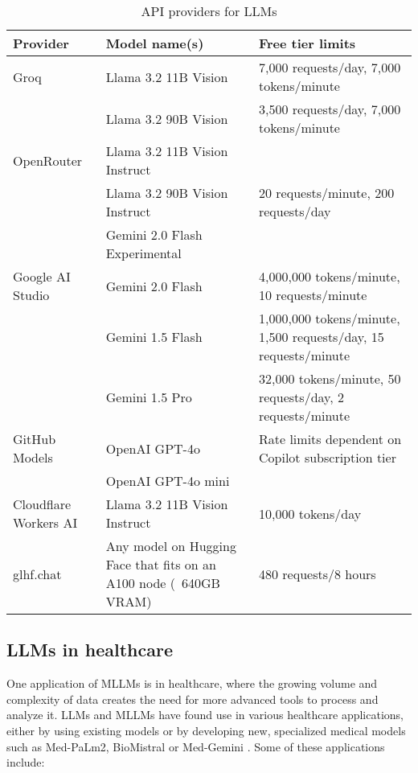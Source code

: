 \begin{table}[h!]
    \centering
    \begin{tabular}{p{2cm} p{5cm} p{6cm}}
        \toprule
        \textbf{Provider} & \textbf{Model name(s)} & \textbf{Free tier limits} \\
        \midrule
        \raggedright
        Groq & Llama 3.2 11B Vision & 7,000 requests/day, 7,000 tokens/minute \\
        & Llama 3.2 90B Vision & 3,500 requests/day, 7,000 tokens/minute \\
        \hline
        \raggedright
        OpenRouter & Llama 3.2 11B Vision Instruct &  \\
        & Llama 3.2 90B Vision Instruct & 20 requests/minute, 200 requests/day \\
        & Gemini 2.0 Flash Experimental &  \\
        \hline
        \raggedright
        Google AI Studio & Gemini 2.0 Flash & 4,000,000 tokens/minute, 10 requests/minute \\
        & Gemini 1.5 Flash & 1,000,000 tokens/minute, 1,500 requests/day, 15 requests/minute \\
        & Gemini 1.5 Pro & 32,000 tokens/minute, 50 requests/day, 2 requests/minute \\
        \hline
        \raggedright
        GitHub Models & OpenAI GPT-4o & Rate limits dependent on Copilot subscription tier \\
        & OpenAI GPT-4o mini & \\
        \hline
        \raggedright
        Cloudflare Workers AI & Llama 3.2 11B Vision Instruct & 10,000 tokens/day \\
        \hline
        \raggedright
        glhf.chat & Any model on Hugging Face that fits on an A100 node (~640GB VRAM)& 480 requests/8 hours \\
        \bottomrule
    \end{tabular}
    \caption{API providers for LLMs}\label{tab:llm_apis}
\end{table}

\FloatBarrier{}
\clearpage

\subsection{LLMs in healthcare}

One application of MLLMs is in healthcare, where the growing volume and complexity of data creates the need for more advanced tools to process and analyze it. LLMs and MLLMs have found use in various healthcare applications, either by using existing models or by developing new, specialized medical models such as Med-PaLm2, BioMistral or Med-Gemini \parencite{biomistral,medgemini,medpalm2}. Some of these applications include:

